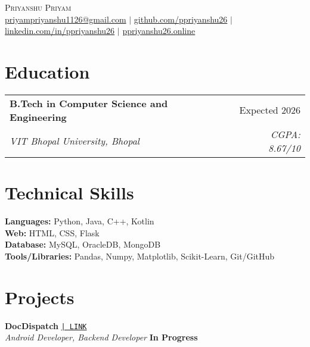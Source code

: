 \documentclass[a4paper,10pt]{article}
\makeatletter
\newcommand{\resumeSubheading}[4]{
  \vspace{1pt}\item
    \begin{tabular*}{\textwidth}{l@{\extracolsep{\fill}}r}
      \textbf{#1} & #2 \\
      \textit{\small#3} & \textit{\small #4} \\
    \end{tabular*}
}
\makeatother
\begin{document}
\begin{center}
  {\Huge \scshape Priyanshu Priyam} \\ \vspace{1pt}
  \href{mailto:priyampriyanshu1126@gmail.com}{priyampriyanshu1126@gmail.com} $|$
  \href{https://github.com/ppriyanshu26}{github.com/ppriyanshu26} $|$
  \href{https://linkedin.com/in/ppriyanshu26}{linkedin.com/in/ppriyanshu26} $|$
  \href{https://ppriyanshu26.online/}{ppriyanshu26.online}
\end{center}

\section{Education}

\vspace{-4pt}
\begin{flushleft}
  \hspace{1.5em}
  \resumeSubheading
    {B.Tech in Computer Science and Engineering}{Expected 2026}
    {VIT Bhopal University, Bhopal}{CGPA: 8.67/10}
\end{flushleft}

\section{Technical Skills}

\vspace{-4pt}
\hspace{1.5em}
\begin{flushleft}
  \textbf{Languages:} Python, Java, C++, Kotlin \\[6pt]
  \textbf{Web:} HTML, CSS, Flask \\[6pt]
  \textbf{Database:} MySQL, OracleDB, MongoDB \\[6pt]
  \textbf{Tools/Libraries:} Pandas, Numpy, Matplotlib, Scikit-Learn, Git/GitHub
\end{flushleft}



\section{Projects}

\noindent
\textbf{DocDispatch}
\href{https://github.com/yashpreeto7/DocDispatch}{\texttt{| LINK}} \\
\textit{Android Developer, Backend Developer} \hfill \textbf{In Progress} \\[-8pt]
\end{document}
